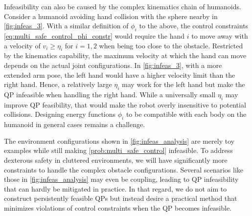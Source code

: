 Infeasibility can also be caused by the complex kinematics chain of humanoids.
Consider a humanoid avoiding hand collision with the sphere nearby in \cref{fig:infeas_3}.
With a similar definition of $\phi_i$ to the above, the control constraints \eqref{eq:multi_safe_control_phi_constr} would require the hand $i$ to move away with a velocity of $v_i \geq \eta_i$ for $i=1,2$ when being too close to the obstacle.
Restricted by the kinematics capability, the maximum velocity at which the hand can move depends on the actual joint configurations.
In \cref{fig:infeas_3}, with a more extended arm pose, the left hand would have a higher velocity limit than the right hand.
Hence, a relatively large $\eta_i$ may work for the left hand but make the QP infeasible when handling the right hand.
While a universally small $\eta_i$ may improve QP feasibility, that would make the robot overly insensitive to potential collisions.
Designing energy functions $\phi_i$ to be compatible with each body on the humanoid in general cases remains a challenge.

The environment configurations shown in \cref{fig:infeas_analysis} are merely toy examples while still making \eqref{prob:multi_safe_control} infeasible.
To address dexterous safety in cluttered environments, we will have significantly more constraints to handle the complex obstacle configurations.
Several scenarios like those in \cref{fig:infeas_analysis} may even be coupling, leading to QP infeasibility that can hardly be mitigated in practice.
In that regard, we do not aim to construct persistently feasible QPs but instead desire a practical method that minimizes violations of control constraints when the QP becomes infeasible.




